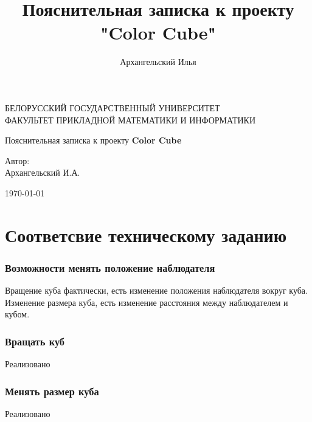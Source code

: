 \documentclass[a4paper,11pt]{article}
\title{Пояснительная записка к проекту "Color Cube"}
\author{Архангельский Илья}
\begin{document}
  \begin{titlepage}
   \begin{center}
		БЕЛОРУССКИЙ ГОСУДАРСТВЕННЫЙ УНИВЕРСИТЕТ \\
		ФАКУЛЬТЕТ ПРИКЛАДНОЙ МАТЕМАТИКИ И ИНФОРМАТИКИ
	\end{center}
	\vspace{10em}
	\begin{center}
	\LARGE{Пояснительная записка к проекту \textbf{Color Cube}}
		
    
	\end{center}
	\vspace{3em}
	\begin{flushright}
	  
	
 	Автор: \\	Архангельский И.А. \\ 
 	
 	  \vspace{1em}
 	
 	  
 	
	\end{flushright}
	
	\vfill
	\begin{center}
		\today
	\end{center}
  \end{titlepage}
  \tableofcontents
  \newpage
  \part{Соответсвие техническому заданию}
   
  \section*{Возможности менять положение наблюдателя }
     
     Вращение куба фактически, есть изменение положения наблюдателя вокруг куба. Изменение размера куба, есть изменение расстояния между наблюдателем и кубом.
    \section*{Вращать куб  }
         
      Реализовано
   \section*{Менять размер куба }
        
      Реализовано 
\end{document}
